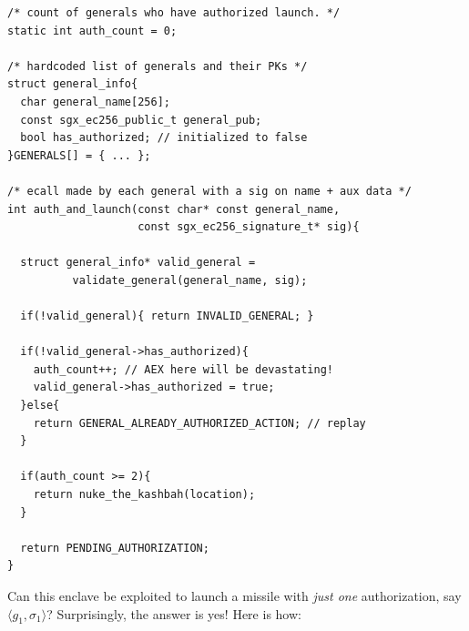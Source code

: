 \documentclass[letterpaper]{article}
\begin{document}
  \begin{center}
  \begin{lstlisting}[captionpos=b,
                     caption={An enclave suseptible to state
                       malleability}, label=code:malleability]
/* count of generals who have authorized launch. */
static int auth_count = 0;

/* hardcoded list of generals and their PKs */
struct general_info{
  char general_name[256];
  const sgx_ec256_public_t general_pub;
  bool has_authorized; // initialized to false
}GENERALS[] = { ... };

/* ecall made by each general with a sig on name + aux data */
int auth_and_launch(const char* const general_name,
                    const sgx_ec256_signature_t* sig){

  struct general_info* valid_general =
          validate_general(general_name, sig);

  if(!valid_general){ return INVALID_GENERAL; }

  if(!valid_general->has_authorized){
    auth_count++; // AEX here will be devastating!
    valid_general->has_authorized = true;
  }else{
    return GENERAL_ALREADY_AUTHORIZED_ACTION; // replay
  }

  if(auth_count >= 2){
    return nuke_the_kashbah(location);
  }

  return PENDING_AUTHORIZATION;
}
\end{lstlisting}
\end{center}

  Can this enclave be exploited to launch a missile with \textit{just
    one} authorization, say $\langle g_1, \sigma_1 \rangle$?
  Surprisingly, the answer is yes! Here is how:
\end{document}
